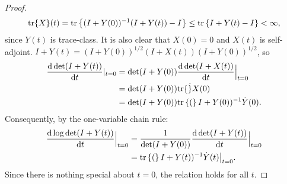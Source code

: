 \documentclass{amsart}
\numberwithin{equation}{section}
\begin{document}
\begin{proof}
\begin{align*}
    \textup{tr}\{X\}(t) = \textup{tr}\left \{(I+Y(0))^{-1} (I+Y(t)) - I \right \}
    \leq \textup{tr}\left \{I+Y(t) - I \right \} < \infty,
  \end{align*}
  since $Y(t)$ is trace-class. It is also clear that
  $X(0) = 0$ and $X(t)$ is self-adjoint.
  $I+Y(t) = (I+Y(0))^{1/2}(I+X(t))(I+Y(0))^{1/2}$, so
  \begin{align*}
    \frac{\text{\textup{d}} \det (I+Y(t))}{\text{\textup{d}} t}|_{t=0} 
    &= \det (I+Y(0))\frac{\text{\textup{d}} \det (I+X(t))}{\text{\textup{d}} t}\Big |_{t=0} \\
    &= \det (I+Y(0)) \textup{tr}\{\dot\}{X}(0) \\
    &= \det (I+Y(0)) \textup{tr}\left \{( \right \}I+Y(0))^{-1} \dot{Y}(0).
  \end{align*}
  Consequently, by the one-variable chain rule:
  \begin{align*}
    \frac{\text{\textup{d}} \log \det (I+Y(t))}{\text{\textup{d}} t}\Big |_{t=0} &=
    \frac{1}{\det (I+Y(0))}\frac{\text{\textup{d}} \det (I+Y(t))}{\text{\textup{d}} t}\Big |_{t=0} \\ 
    &= \textup{tr}\left \{( \right \}I+Y(t))^{-1} \dot{Y}(t) \big |_{t=0}.
  \end{align*}
  Since there is nothing special about $t=0$, the relation holds for all $t$.
\end{proof}
\end{document}
